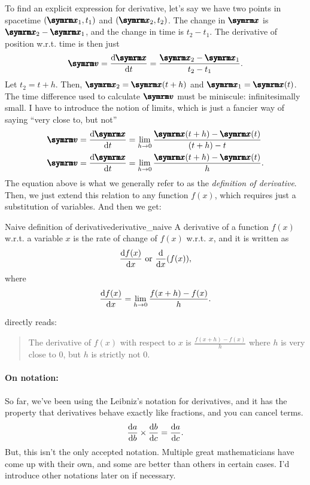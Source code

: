 To find an explicit expression for derivative, let's say we have two points in spacetime $(\vv{x}_1, t_1)$ and $(\vv{x}_2, t_2)$. The change in $\vv{x}$ is $\vv{x}_2 - \vv{x}_1$, and the change in time is $t_2 - t_1$. The derivative of position w.r.t. time is then just
\begin{equation}
    \vv{v} = \dv{\vv{x}}{t} = \frac{\vv{x}_2 - \vv{x}_1}{t_2 - t_1}. \label{eq:derivative1}
\end{equation}
Let $t_2 = t + h$. Then, $\vv{x}_2 = \vv{x}(t + h)$ and $\vv{x}_1 = \vv{x}(t)$. The time difference used to calculate $\vv{v}$ must be miniscule: infinitesimally small. I have to introduce the notion of limits, which is just a fancier way of saying ``very close to, but not''
\begin{align}
    \vv{v} = \dv{\vv{x}}{t} &= \lim_{h \appr 0}\frac{\vv{x}(t + h) - \vv{x}(t)}{(t + h) - t} \\
    \vv{v} = \dv{\vv{x}}{t} &= \lim_{h \appr 0}\frac{\vv{x}(t + h) - \vv{x}(t)}{h}.
\end{align}
The equation above is what we generally refer to as the \emph{definition of derivative}. Then, we just extend this relation to any function $f(x)$, which requires just a substitution of variables. And then we get:
\begin{df}{Naive definition of derivative}{derivative_naive}
    A derivative of a function $f(x)$ w.r.t. a variable $x$ is the rate of change of $f(x)$ w.r.t. $x$, and it is written as
    \begin{equation}
        \dv{f(x)}{x}~\textrm{or}~\dv{x}(f(x)),
    \end{equation}
    where
    \begin{equation}
        \dv{f(x)}{x} = \lim_{h \rightarrow 0}\frac{f(x + h) - f(x)}{h}.\label{eq:naive_definition_of_derivative}
    \end{equation}
\end{df}
 directly reads:
\begin{quote}
    The derivative of $f(x)$ with respect to $x$ is $\frac{f(x + h) - f(x)}{h}$ where $h$ is very close to $0$, but $h$ is strictly not $0$.
\end{quote}

\paragraph{On notation:} So far, we've been using the Leibniz's notation for derivatives, and it has the property that derivatives behave exactly like fractions, and you can cancel terms.
\begin{equation}
    \dv{a}{b}\times\dv{b}{c} = \dv{a}{c}.\label{eq:prechainrule}
\end{equation}
But, this isn't the only accepted notation. Multiple great mathematicians have come up with their own, and some are better than others in certain cases. I'd introduce other notations later on if necessary.

